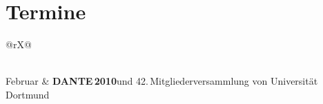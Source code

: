 
\vspace*{-3mm}

\chapter{Termine}\label{termine}

\begin{tabularx}{\linewidth}{@{}rX@{}}

\iffalse
\multicolumn{2}{@{}l}{\textbf{2009}}  \\[3pt]

28.\,7. -- 31.\,7. & 
 \textbf{TUG 2009}\newline
 Notre Dame (Indiana), USA\newline
 \url{http://tug.org/tug2009/} \\[3pt]

24.\,8. -- 28.\,8. & 
 \textbf{Euro\TeX\ 2009 und Con\TeX t meeting}\newline
 Den Haag, Niederlande\newline
 \url{http://www.ntg.nl/EuroTeX2009/} \\[3pt]

12.\,9. &
  \textbf{Herbsttagung}\newline und 41.\,Mitgliederversammlung von \dante\newline
  Hochschule Esslingen\newline
  \url{http://www.dante.de/events/mv41.html} \\[3pt]


2.\,10. -- 3.\,10. &
  \textbf{Kieler Linux- und OpenSource-Tage} \newline  
  Kieler Innovations- und Technologiezentrum\newline
  Schauenburgerstr. 116, 24118 Kiel\\[3pt]

13.\,10. &
  \textbf{GuiT} 2007 meeting\newline
  Pisa, Italien\newline
  \url{http://www.guit.sssup.it/GuITmeeting/2007/2007.en.php/} \\[3pt]
\fi


 \\[3pt]
Februar &
  \textbf{DANTE\,2010}\newline und 42.\,Mitgliederversammlung von \dante\newline
  Universität Dortmund\newline
  ~%
  \\[3pt]


\end{tabularx}
